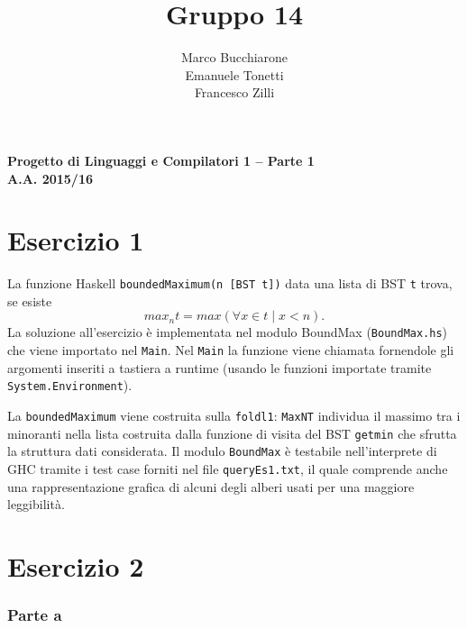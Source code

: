 \documentclass[a4paper, oneside, 11pt]{article}
\makeatletter
\renewcommand\and{\\}
\renewcommand\maketitle{%
\bigskip\bigskip\bigskip\bigskip%
\begin{center}\bfseries\large%
Progetto di Linguaggi e Compilatori 1 -- Parte 1 \\ A.A. 2015/16\\%
\end{center}%
\bigskip%
\begin{center}\bfseries\LARGE \@title  \end{center}%
\bigskip%
\begin{center}\bfseries\large \@author \end{center}%
\bigskip\bigskip}
\makeatother
\begin{document}
\title{Gruppo 14}
\author{Marco Bucchiarone \and Emanuele Tonetti \and Francesco Zilli}
\maketitle
%
\section*{Esercizio 1}
La funzione Haskell \texttt{boundedMaximum(n [BST t])} data una lista di BST \texttt{t} trova, se esiste  \[max_{n}{t}=max(\forall x \in t \mid  x<n ).\]
La soluzione all'esercizio \`e implementata nel modulo BoundMax (\texttt{BoundMax.hs}) che viene importato nel \texttt{Main}.
Nel \texttt{Main} la funzione viene chiamata fornendole gli argomenti inseriti a tastiera a runtime (usando le funzioni importate tramite \texttt{System.Environment}).
\par
La \texttt{boundedMaximum} viene costruita sulla \texttt{foldl1}: \texttt{MaxNT} individua il massimo tra i minoranti nella lista costruita dalla funzione di visita del BST \texttt{getmin} che sfrutta la struttura dati considerata.
Il modulo \texttt{BoundMax} \`e testabile nell'interprete di GHC tramite i test case forniti nel file \texttt{queryEs1.txt}, il quale comprende anche una rappresentazione grafica di alcuni degli alberi usati per una maggiore leggibilit\`a.
%
\section*{Esercizio 2}
\subsubsection*{Parte a}
\end{document}
